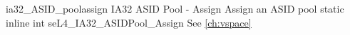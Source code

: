 %
%
%
%

\apidoc
{ia32_ASID_poolassign}
{IA32 ASID Pool - Assign}
{Assign an ASID pool}
{static inline int seL4\_IA32\_ASIDPool\_Assign}
{
}
{\errorenumdesc}
{See \autoref{ch:vspace}}
